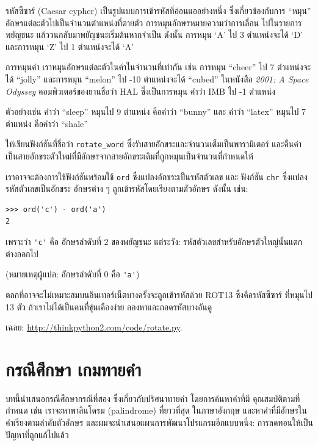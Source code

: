 \begin{exercise}

\label{exrotate}
รหัสซีซาร์ (Caesar cypher) เป็นรูปแบบการเข้ารหัสที่อ่อนแออย่างหนึ่ง ซึ่งเกี่ยวข้องกับการ 
``หมุน'' อักษรแต่ละตัวไปเป็นจำนวนตำแหน่งที่ตายตัว การหมุนอักษรหมายความว่าการเลื่อน
ไปในรายการพยัญชนะ แล้ววนกลับมาพยัญชนะเริ่มต้นหากจำเป็น ดังนั้น การหมุน `A' ไป 3
ตำแหน่งจะได้ `D' และการหมุน `Z' ไป 1 ตำแหน่งจะได้ `A'

การหมุนคำ เราหมุนอักษรแต่ละตัวในคำในจำนวนที่เท่ากัน เช่น การหมุน ``cheer'' ไป 7
ตำแหน่งจะได้ ``jolly'' และการหมุน ``melon'' ไป -10 ตำแหน่งจะได้ ``cubed''
ในหนังสือ {\em 2001: A Space Odyssey} คอมพิวเตอร์ของยานชื่อว่า HAL ซึ่งเป็นการหมุน
คำว่า IMB ไป -1 ตำแหน่ง 

ตัวอย่างเช่น คำว่า ``sleep'' หมุนไป 9 ตำแหน่ง คือคำว่า ``bunny'' และ
คำว่า ``latex'' หมุนไป 7 ตำแหน่ง คือคำว่า ``shale''

ให้เขียนฟังก์ชันที่ชื่อว่า \verb"rotate_word" ซึ่งรับสายอักขระและจำนวนเต็มเป็นพารามิเตอร์
และคืนค่าเป็นสายอักขระตัวใหม่ที่มีอักษรจากสายอักขระเดิมที่ถูกหมุนเป็นจำนวนที่กำหนดให้

เราอาจจะต้องการใช้ฟังก์ชันพร้อมใช้ {\tt ord} ซึ่งแปลงอักขระเป็นรหัสตัวเลข และ ฟังก์ชัน 
{\tt chr} ซึ่งแปลงรหัสตัวเลขเป็นอักขระ อักษรต่าง ๆ ถูกเข้ารหัสโดยเรียงตามตัวอักษร
ดังนั้น เช่น:

\begin{verbatim}
>>> ord('c') - ord('a')
2
\end{verbatim}

เพราะว่า \verb"'c'" คือ อักษรลำดับที่ 2 ของพยัญชนะ  
แต่ระวัง: รหัสตัวเลขสำหรับอักษรตัวใหญ่นั้นแตกต่างออกไป

(หมายเหตุผู้แปล: อักษรลำดับที่ 0 คือ \verb"'a'")

ตลกที่อาจจะไม่เหมาะสมบนอินเทอร์เน็ตบางครั้งจะถูกเข้ารหัสด้วย ROT13 ซึ่งคือรหัสซีซาร์
ที่หมุนไป 13 ตัว ถ้าเราไม่ได้เป็นคนที่ขุ่นเคืองง่าย ลองหาและถอดรหัสบางอันดู

เฉลย: \url{http://thinkpython2.com/code/rotate.py}.

\end{exercise}



\chapter{กรณีศึกษา เกมทายคำ } %
\label{wordplay}

บทนี้นำเสนอกรณีศึกษากรณีที่สอง ซึ่งเกี่ยวกับปริศนาทายคำ โดยการค้นหาคำที่มี
คุณสมบัติตามที่กำหนด เช่น เราจะหาพาลินโดรม (palindrome) ที่ยาวที่สุด
ในภาษาอังกฤษ และหาคำที่มีอักษรในคำเรียงตามลำดับตัวอักษร 
และผมจะนำเสนอแผนการพัฒนาโปรแกรมอีกแบบหนึ่ง: การลดทอนให้เป็นปัญหาที่ถูกแก้ไปแล้ว


